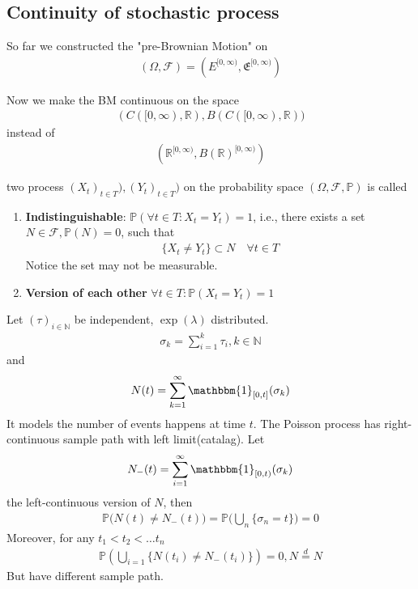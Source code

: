 \subsection{Continuity of stochastic process}
So far we constructed the "pre-Brownian Motion" on 
\begin{align*}
	(\Omega, \mathcal{F}) = (E^{[0, \infty)}, \mathfrak{E}^{[0, \infty)})
\end{align*}

Now we make the BM continuous on the space
\begin{align*}
	(C([0, \infty), \mathbb{R}), B(C([0, \infty), \mathbb{R}))
\end{align*}
instead of 
\begin{align*}
	(\mathbb{R}^{[0, \infty)}, B(\mathbb{R})^{[0, \infty)})
\end{align*}


\begin{definition}
	two process $(X_t)_{t \in T}), (Y_t)_{t \in T})$ on the probability space $(\Omega, \mathcal{F}, \mathbb{P})$ is called
	\begin{enumerate}
		\item \textbf{Indistinguishable}: $\mathbb{P}(\forall t \in T: X_t = Y_t) = 1$, i.e., there exists a set $N \in \mathcal{F}, \mathbb{P}(N) = 0$, such that 
		\begin{align*}
			\{X_t \neq Y_t\} \subset N \quad \forall t \in T
		\end{align*}
		Notice the set may not be measurable.
		\item \textbf{Version of each other} $\forall t \in T: \mathbb{P}(X_t = Y_t) = 1$
	\end{enumerate}
\end{definition}

\begin{example}
	Let $(\tau)_{i \in \mathbb{N}}$ be independent, $\exp(\lambda)$ distributed.
	\begin{align*}
		\sigma_k = \sum_{i = 1}^k \tau_i, k \in \mathbb{N}
	\end{align*}
	and 
	\begin{align*}
		N(t) = \sum_{k = 1}^\infty \mathbbm{1}_{[0, t]}(\sigma_k)
	\end{align*}
	It models the number of events happens at time $t$. The Poisson process has right-continuous sample path with left limit(catalag). Let 
	\begin{align*}
		N_-(t) = \sum_{i = 1}^\infty \mathbbm{1}_{[0, t)}(\sigma_k)
	\end{align*}
	the left-continuous version of $N$, then
	\begin{align*}
		\mathbb{P}\bigg(N(t) \neq N_-(t)\bigg) = \mathbb{P}\bigg(\bigcup_n \{\sigma_n = t\}\bigg) = 0
	\end{align*}
	Moreover, for any $t_1 < t_2 < \dots t_n$
	\begin{align*}
		\mathbb{P}(\bigcup_{i = 1}\{N(t_i) \neq N_-(t_i)\}) = 0, N\overset{d}{=} N
	\end{align*}
	But have different sample path.
\end{example}

